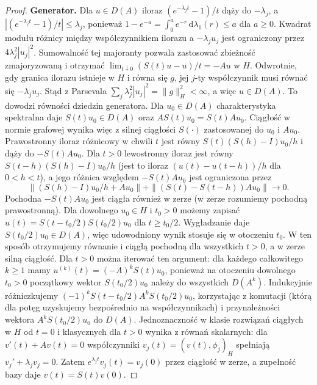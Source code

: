 \begin{proof}
\textbf{Generator.} Dla $u\in D(A)$ iloraz
$(e^{-\lambda_jt}-1)/t$ dąży do $-\lambda_j$, a
$|(e^{-\lambda_jt}-1)/t|\le\lambda_j$,
ponieważ $1-e^{-a}=\int_0^a e^{-r}\,\mathrm d\lambda_1(r)
\le a$ dla $a\ge0$. Kwadrat modułu różnicy
między współczynnikiem ilorazu a $-\lambda_j u_j$
jest ograniczony przez $4\lambda_j^2|u_j|^2$.
Sumowalność tej majoranty pozwala zastosować zbieżność
zmajoryzowaną i otrzymać
$\lim_{t\downarrow0}(S(t)u-u)/t=-Au$ w $H$.
Odwrotnie, gdy granica ilorazu istnieje w $H$ i równa się
$g$, jej $j$-ty współczynnik musi równać się
$-\lambda_ju_j$. Stąd z Parsevala
$\sum_j\lambda_j^2|u_j|^2=\|g\|_H^2<\infty$,
a więc $u\in D(A)$. To dowodzi równości dziedzin generatora.
Dla $u_0\in D(A)$ charakterystyka spektralna daje
$S(t)u_0\in D(A)$ oraz $AS(t)u_0=S(t)Au_0$.
Ciągłość w normie grafowej wynika więc z silnej ciągłości
$S(\cdot)$ zastosowanej do $u_0$ i $Au_0$.
Prawostronny iloraz różnicowy w chwili $t$ jest równy
$S(t)(S(h)-I)u_0/h$ i dąży do $-S(t)Au_0$.
Dla $t>0$ lewostronny iloraz jest równy
$S(t-h)(S(h)-I)u_0/h$ (jest to iloraz
$(u(t)-u(t-h))/h$ dla $0<h<t$), a jego różnica względem
$-S(t)Au_0$ jest ograniczona przez
\[
 \|(S(h)-I)u_0/h+Au_0\|
 +\|(S(t)-S(t-h))Au_0\|\longrightarrow0.
\]
Pochodna $-S(t)Au_0$ jest ciągła również w zerze
(w zerze rozumiemy pochodną prawostronną).
Dla dowolnego $u_0\in H$ i $t_0>0$ możemy zapisać
$u(t)=S(t-t_0/2)S(t_0/2)u_0$ dla $t\ge t_0/2$.
Wygładzanie daje $S(t_0/2)u_0\in D(A)$,
więc udowodniony wynik stosuje się w otoczeniu $t_0$.
W ten sposób otrzymujemy równanie i ciągłą pochodną
dla wszystkich $t>0$, a w zerze silną ciągłość.
Dla $t>0$ można iterować ten argument: dla każdego
całkowitego $k\ge1$ mamy $u^{(k)}(t)=(-A)^kS(t)u_0$,
ponieważ na otoczeniu dowolnego $t_0>0$ początkowy
wektor $S(t_0/2)u_0$ należy do wszystkich $D(A^k)$.
Indukcyjnie różniczkujemy
$(-1)^kS(t-t_0/2)A^kS(t_0/2)u_0$,
korzystając z komutacji (którą dla potęg uzyskujemy
bezpośrednio na współczynnikach) i przynależności
wektora $A^kS(t_0/2)u_0$ do $D(A)$.
Jednoznaczność w klasie rozwiązań ciągłych w $H$
od $t=0$ i klasycznych dla $t>0$ wynika z równań
skalarnych: dla $v'(t)+Av(t)=0$ współczynniki
$v_j(t)=(v(t),\phi_j)_H$ spełniają
$v_j'+\lambda_jv_j=0$. Zatem
$e^{\lambda_jt}v_j(t)=v_j(0)$ przez ciągłość w zerze,
a zupełność bazy daje $v(t)=S(t)v(0)$.
\end{proof}


